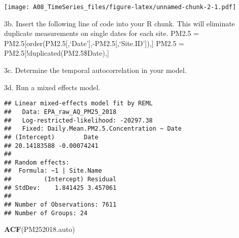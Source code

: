 \documentclass[]{article}
\newenvironment{Shaded}{\begin{snugshade}}{\end{snugshade}}
\newcommand{\KeywordTok}[1]{\textcolor[rgb]{0.13,0.29,0.53}{\textbf{#1}}}
\newcommand{\DataTypeTok}[1]{\textcolor[rgb]{0.13,0.29,0.53}{#1}}
\newcommand{\DecValTok}[1]{\textcolor[rgb]{0.00,0.00,0.81}{#1}}
\newcommand{\FloatTok}[1]{\textcolor[rgb]{0.00,0.00,0.81}{#1}}
\newcommand{\StringTok}[1]{\textcolor[rgb]{0.31,0.60,0.02}{#1}}
\newcommand{\CommentTok}[1]{\textcolor[rgb]{0.56,0.35,0.01}{\textit{#1}}}
\newcommand{\OperatorTok}[1]{\textcolor[rgb]{0.81,0.36,0.00}{\textbf{#1}}}
\newcommand{\NormalTok}[1]{#1}
\begin{document}
\texttt{[image: A08\_TimeSeries\_files/figure-latex/unnamed-chunk-2-1.pdf]}

3b. Insert the following line of code into your R chunk. This will
eliminate duplicate measurements on single dates for each site. PM2.5 =
PM2.5{[}order(PM2.5{[},`Date'{]},-PM2.5{[},`Site.ID'{]}),{]} PM2.5 =
PM2.5{[}!duplicated(PM2.5\$Date),{]}

3c. Determine the temporal autocorrelation in your model.

3d. Run a mixed effects model.

\begin{Shaded}
\end{Shaded}

\begin{verbatim}
## Linear mixed-effects model fit by REML
##   Data: EPA_raw_AQ_PM25_2018 
##   Log-restricted-likelihood: -20297.38
##   Fixed: Daily.Mean.PM2.5.Concentration ~ Date 
## (Intercept)        Date 
## 20.14183588 -0.00074241 
## 
## Random effects:
##  Formula: ~1 | Site.Name
##         (Intercept) Residual
## StdDev:    1.841425 3.457061
## 
## Number of Observations: 7611
## Number of Groups: 24
\end{verbatim}

\begin{Shaded}
\begin{Highlighting}[]
\KeywordTok{ACF}\NormalTok{(PM252018.auto)}
\end{Highlighting}
\end{Shaded}
\end{document}
